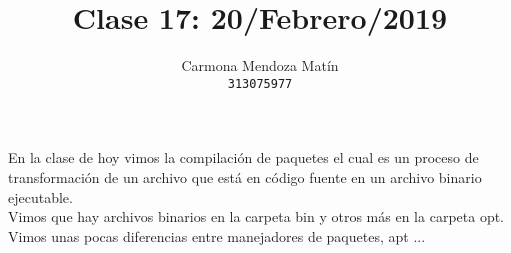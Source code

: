\documentclass[11pt, a4paper]{report}
\begin{document}
\title{Clase 17: 20/Febrero/2019}
\author{
  Carmona Mendoza Mat\'in\\
  \texttt{313075977}
}
\date{}
\maketitle

En la clase de hoy vimos la compilación de paquetes el cual es un proceso
de transformación de un archivo que está en código fuente en un archivo
binario ejecutable. \\

Vimos que hay archivos binarios en la carpeta bin y otros más en la carpeta
opt. \\


Vimos unas pocas diferencias entre manejadores de paquetes, apt ...
\end{document}
